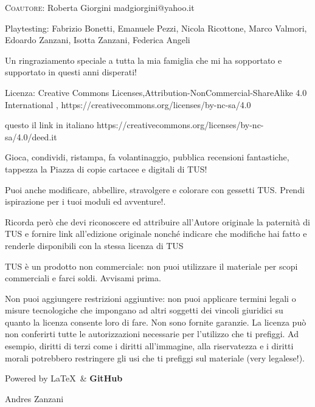 \documentclass[a4paper,11pt,twoside,openany]{book}
\begin{document}
\bigskip
\textsc{Coautore}: Roberta Giorgini madgiorgini@yahoo.it

\bigskip

Playtesting: Fabrizio Bonetti, Emanuele Pezzi, Nicola Ricottone, Marco Valmori, Edoardo Zanzani, Isotta Zanzani, Federica Angeli

\bigskip

Un ringraziamento speciale a tutta la mia famiglia che mi ha sopportato e supportato in questi anni disperati!

\bigskip

Licenza: Creative Commons Licenses,Attribution-NonCommercial-ShareAlike 4.0 International , https://creativecommons.org/licenses/by-nc-sa/4.0

questo il link in italiano https://creativecommons.org/licenses/by-nc-sa/4.0/deed.it

Gioca, condividi, ristampa, fa volantinaggio, pubblica recensioni fantastiche, tappezza la Piazza di copie cartacee e digitali di TUS!

Puoi anche modificare, abbellire, stravolgere e colorare con gessetti TUS. Prendi ispirazione per i tuoi moduli ed avventure!.

Ricorda però che devi riconoscere ed attribuire all'Autore originale la paternità di TUS e fornire link all'edizione originale nonché indicare che modifiche hai fatto e renderle disponibili con la stessa licenza di TUS

\bigskip
TUS è un prodotto non commerciale: non puoi utilizzare il materiale per scopi commerciali e farci soldi. Avvisami prima.

\bigskip
Non puoi aggiungere restrizioni aggiuntive: non puoi applicare termini legali o misure tecnologiche che impongano ad altri soggetti dei vincoli giuridici su quanto la licenza consente loro di fare. Non sono fornite garanzie. La licenza può non conferirti tutte le autorizzazioni necessarie per l'utilizzo che ti prefiggi. Ad esempio, diritti di terzi come i diritti all'immagine, alla riservatezza e i diritti morali potrebbero restringere gli usi che ti prefiggi sul materiale (very legalese!).

\bigskip

Powered by \Large\LaTeX\ \normalfont\& \Large\textbf{GitHub}

\bigskip

Andres Zanzani


\normalsize

\pagebreak
\end{document}
